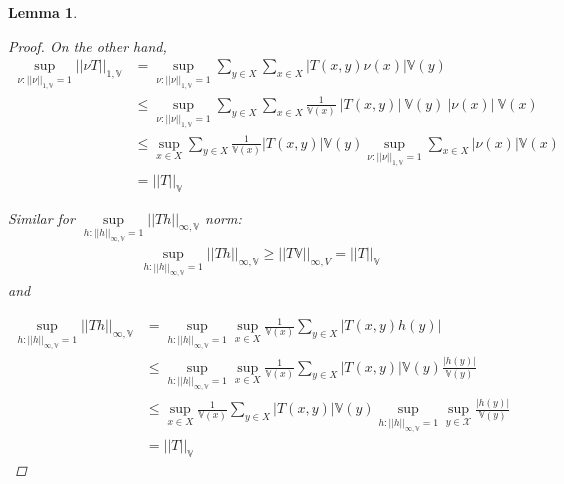 \documentclass[11pt]{article}
\newcommand{\X}{\mathcal{X}}
\newcommand{\V}{\mathbb{V}}
\newtheorem{lemma}{Lemma}
\theoremstyle{definition}
\numberwithin{equation}{section}
\begin{document}
\begin{lemma}
\begin{proof}
On the other hand, 
\begin{align*}
 \sup\limits_{\nu:||\nu||_{1, \V}=1} ||\nu T ||_{1, \V}  &= \sup\limits_{\nu:||\nu||_{1, \V}=1}   \sum\limits_{y\in X}   \sum\limits_{x\in X} |T(x, y) \nu(x)| \V(y) \\
& \leq  \sup\limits_{\nu:||\nu||_{1, \V}=1}   \sum\limits_{y\in X}   \sum\limits_{x\in X}  \frac{1}{\V(x)}~|T(x, y)| ~ \V(y) ~ |\nu(x)|~ \V(x)\\
& \leq \sup\limits_{x\in X} \sum\limits_{y\in X}   \frac{1}{\V(x)} |T(x, y)|  \V(y) \sup\limits_{\nu:||\nu||_{1, \V}=1}  \sum\limits_{x\in X} |\nu(x)| \V(x)\\
& = ||T||_\V
\end{align*}

Similar for $\sup\limits_{h:||h||_{\infty, \V} = 1} || Th ||_{\infty, \V}$ norm:
\begin{align*}
 \sup\limits_{h:||h||_{\infty, \V} = 1} || Th ||_{\infty, \V}  \geq ||T\V ||_{\infty, V} = ||T||_\V
\end{align*}
and 

\begin{align*}
 \sup\limits_{h:||h||_{\infty, \V} = 1} || Th ||_{\infty, \V}   &= \sup\limits_{h:||h||_{\infty, \V}=1}   \sup\limits_{x \in X}  \frac{1}{\V(x)}  \sum\limits_{y\in X} |T(x, y) h(y)|  \\
& \leq  \sup\limits_{h:||h||_{\infty, \V}=1}   \sup\limits_{x \in X}  \frac{1}{\V(x)}  \sum\limits_{y\in X} |T(x, y)| \V(y)  \frac{|h(y)|}{\V(y)}\\
 &\leq   \sup\limits_{x\in X}  \frac{1}{\V(x)}  \sum\limits_{y\in X} |T(x, y)| \V(y)     \sup\limits_{h:||h||_{\infty, \V}=1} \sup\limits_{y\in \X}\frac{|h(y)|}{\V(y)}\\
 &=||T||_\V
\end{align*}

\end{proof}
\end{lemma}
\end{document}
